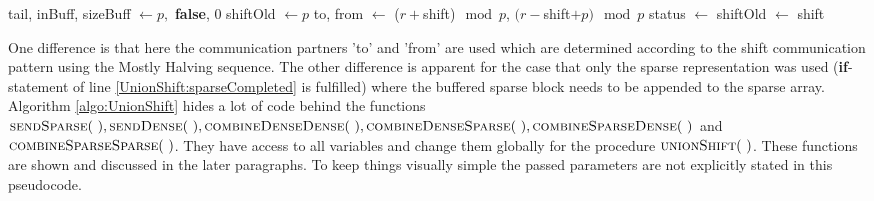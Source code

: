 \begin{algorithm}
	\caption{Distributed set union using Mostly Halving communication pattern and a dynamic representation of sets.\\
		$r$: rank Id of the process\\
		$p$: number of processes\\
		$I_s$: input array with sparse representation of $S_r$\\
		$sparseSize$: length of sparse list\\
		$I_d$: input array with dense representation of $S_r$\\
		$isDense$: flag to indicate, which representation holds \\
		$critSize$: threshold to switch to the dense variant} \label{algo:UnionShift}
	\begin{algorithmic}[1]
		\State tail, inBuff, sizeBuff $\gets p,$ \textbf{false}, $0$
		\State shiftOld $\gets p$
			\Statex{}
			\State to, from $\gets$ ($r +$shift)$\mod{p}$, $(r-$shift$+p)\mod{p}$ 
				\State{}
				\Else
				\State{}
			\EndIf
			\State status $\gets$  
			\Statex{}
			\Statex{}
					\State{}
				\Else 
					\State{}
				\EndIf
					\State{}
				\Else
					\State{}
				\EndIf
			\EndIf	
			\State shiftOld $\gets$ shift		
		\EndFor
		  \label{UnionShift:sparseCompleted}
			\State{} \label{UnionShift:copyBuff}
			\State \Return
		\EndIf
		\State{} 
		\EndProcedure
	\end{algorithmic}
\end{algorithm}
One difference is that here the communication partners 'to' and 'from' are used which are determined according to the shift communication pattern using the Mostly Halving sequence. The other difference is apparent for the case that only the sparse representation was used (\textbf{if}-statement of line \ref{UnionShift:sparseCompleted} is fulfilled) where the buffered sparse block needs to be appended to the sparse array. Algorithm \ref{algo:UnionShift} hides  a lot of code behind the functions $\Call{sendSparse}{~}, \Call{sendDense}{~}, \Call{combineDenseDense}{~}, \Call{combineDenseSparse}{~}, \linebreak \Call{combineSparseDense}{~}$ and $\Call{combineSparseSparse}{~}$. They have access to all variables and change them globally for the procedure $\Call{unionShift}{~}$. These functions are shown and discussed in the later paragraphs. To keep things visually simple the passed parameters are not explicitly stated in this pseudocode.

